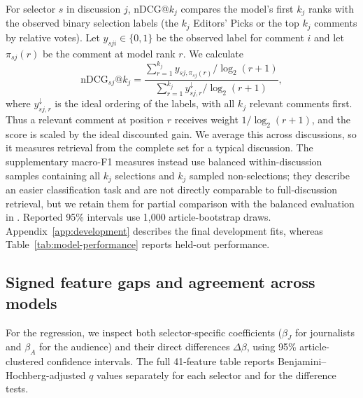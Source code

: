 For selector $s$ in discussion $j$, nDCG@$k_j$ \citep{Wang2013} compares the model's first $k_j$ ranks with the observed binary selection labels (the $k_j$ Editors' Picks or the top $k_j$ comments by relative votes). Let $y_{sji}\in\{0,1\}$ be the observed label for comment $i$ and let $\pi_{sj}(r)$ be the comment at model rank $r$. We calculate
\begin{equation}
\mathrm{nDCG}_{sj}@k_j=
\frac{\displaystyle\sum_{r=1}^{k_j}y_{sj,\pi_{sj}(r)}/\log_2(r+1)}
{\displaystyle\sum_{r=1}^{k_j}y^{\downarrow}_{sj,r}/\log_2(r+1)},
\end{equation}
where $y^{\downarrow}_{sj,r}$ is the ideal ordering of the labels, with all $k_j$ relevant comments first. Thus a relevant comment at position $r$ receives weight $1/\log_2(r+1)$, and the score is scaled by the ideal discounted gain.
We average this across discussions, so it measures retrieval from the complete set for a typical discussion. The supplementary macro-F1 measures instead use balanced within-discussion samples containing all $k_j$ selections and $k_j$ sampled non-selections; they describe an easier classification task and are not directly comparable to full-discussion retrieval, but we retain them for partial comparison with the balanced evaluation in \citet{He2024}. Reported 95\% intervals use 1,000 article-bootstrap draws. Appendix~\ref{app:development} describes the final development fits, whereas Table~\ref{tab:model-performance} reports held-out performance.

\subsection{Signed feature gaps and agreement across models}
For the regression, we inspect both selector-specific coefficients ($\beta_J$ for journalists and $\beta_A$ for the audience) and their direct differences $\Delta \beta$, using 95\% article-clustered confidence intervals. The full 41-feature table reports Benjamini--Hochberg-adjusted $q$ values separately for each selector and for the difference tests.

